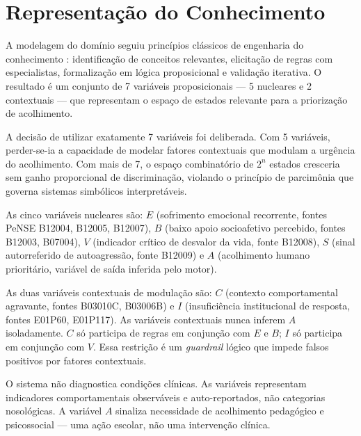 \documentclass[
    12pt,
    openright,
    oneside,
    a4paper,
    english,
    brazil
]{abntex2}
\begin{document}
\chapter{Representação do Conhecimento}

A modelagem do domínio seguiu princípios clássicos de engenharia do conhecimento \cite{brachman_levesque_2004}: identificação de conceitos relevantes, elicitação de regras com especialistas, formalização em lógica proposicional e validação iterativa. O resultado é um conjunto de 7 variáveis proposicionais --- 5 nucleares e 2 contextuais --- que representam o espaço de estados relevante para a priorização de acolhimento.

A decisão de utilizar exatamente 7 variáveis foi deliberada. Com 5 variáveis, perder-se-ia a capacidade de modelar fatores contextuais que modulam a urgência do acolhimento. Com mais de 7, o espaço combinatório de $2^n$ estados cresceria sem ganho proporcional de discriminação, violando o princípio de parcimônia que governa sistemas simbólicos interpretáveis.

As cinco variáveis nucleares são: $E$ (sofrimento emocional recorrente, fontes PeNSE B12004, B12005, B12007), $B$ (baixo apoio socioafetivo percebido, fontes B12003, B07004), $V$ (indicador crítico de desvalor da vida, fonte B12008), $S$ (sinal autorreferido de autoagressão, fonte B12009) e $A$ (acolhimento humano prioritário, variável de saída inferida pelo motor).

As duas variáveis contextuais de modulação são: $C$ (contexto comportamental agravante, fontes B03010C, B03006B) e $I$ (insuficiência institucional de resposta, fontes E01P60, E01P117). As variáveis contextuais nunca inferem $A$ isoladamente. $C$ só participa de regras em conjunção com $E$ e $B$; $I$ só participa em conjunção com $V$. Essa restrição é um \textit{guardrail} lógico que impede falsos positivos por fatores contextuais.

O sistema não diagnostica condições clínicas. As variáveis representam indicadores comportamentais observáveis e auto-reportados, não categorias nosológicas. A variável $A$ sinaliza necessidade de acolhimento pedagógico e psicossocial --- uma ação escolar, não uma intervenção clínica.



\end{document}
